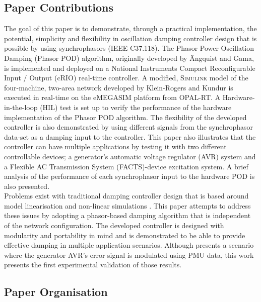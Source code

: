 \documentclass[journal]{IEEEtran}
\begin{document}
\subsection{Paper Contributions}
The goal of this paper is to demonstrate, through a practical implementation, the potential, simplicity and flexibility in oscillation damping controller design that is possible by using synchrophasors (IEEE C37.118). The Phasor Power Oscillation Damping (Phasor POD) algorithm, originally developed by \"{A}ngquist and Gama\cite{PhasorPOD}, is implemented and deployed on a National Instruments Compact Reconfigurable Input / Output (cRIO) real-time controller. A modified, \textsc{Simulink} model of the four-machine, two-area network developed by Klein-Rogers and Kundur \cite{KundurTwoArea} is executed in real-time on the eMEGASIM \cite{eMEGASIM} platform from OPAL-RT. A Hardware-in-the-loop (HIL) test is set up to verify the performance of the hardware implementation of the Phasor POD algorithm. The flexibility of the developed controller is also demonstrated by using different signals from the synchrophasor data-set as a damping input to the controller. This paper also illustrates that the controller can have multiple applications by testing it with two different controllable devices; a generator's automatic voltage regulator (AVR) system and a Flexible AC Transmission System (FACTS)-device excitation system. A brief analysis of the performance of each synchrophasor input to the hardware POD is also presented.\\

Problems exist with traditional damping controller design that is based around model linearisation and non-linear simulations \cite{WAPODChina}. This paper attempts to address these issues by adopting a phasor-based damping algorithm \cite{PhasorPOD} that is independent of the network configuration. The developed controller is designed with modularity and portability in mind and is demonstrated to be able to provide effective damping in multiple application scenarios. Although \cite{Yuwa} presents a scenario where the generator AVR\rq{s} error signal is modulated using PMU data, this work presents the first experimental validation of those results.

\subsection{Paper Organisation}
\end{document}
